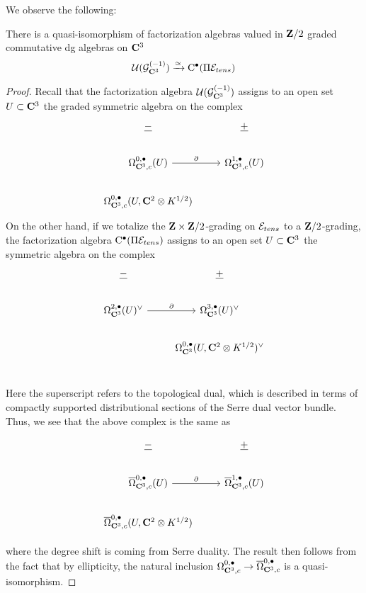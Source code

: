 \documentclass[../main.tex]{subfiles}
\begin{document}
We observe the following:
\begin{prop}
\label{prop:factabelian}
There is a quasi-isomorphism of factorization algebras valued in $\mathbf{Z}/2$ graded commutative dg algebras on $\mathbf{C}^3$
\[
\mathcal{U} (\mathcal{G}^{(-1)}_{\mathbf{C}^3} )\xrightarrow{\simeq} {\mathrm{C}}^\bullet(\Pi \mathcal{E}_{tens})
\]
\end{prop}

\begin{proof}
Recall that the factorization algebra $\mathcal{U}(\mathcal{G}_{\mathbf{C}^3}^{(-1)})$ assigns to an open set $U\subset \mathbf{C}^3$ the graded symmetric algebra on the complex
\begin{equation}\label{eqn:weight-1}
\begin{tikzcd}
\ul{-} & \ul{+}\\
\Omega_{\C^3, c}^{0,\bullet}(U) \ar[r,"\del"] & \Omega_{\C^3, c}^{1,\bullet}(U) \\
\Omega_{\C^3, c}^{0,\bullet}(U, \C^2\otimes K^{1/2}) & 
\end{tikzcd}
\end{equation}
On the other hand, if we totalize the $\mathbf{Z}\times\mathbf{Z}/2$-grading on $\mathcal{E}_{tens}$ to a $\mathbf{Z}/2$-grading, the factorization algebra ${\mathrm{C}}^\bullet (\Pi \mathcal{E}_{tens})$ assigns to an open set $U\subset \mathbf{C}^3$ the symmetric algebra on the complex 
\begin{equation}
\begin{tikzcd}
\ul{-} & \ul{+}\\
\Omega_{\C^3}^{2,\bullet}(U)^\vee \ar[r,"\del"] & \Omega_{\C^3}^{3,\bullet}(U)^\vee \\
& \Omega_{\C^3}^{0,\bullet}(U, \C^2\otimes K^{1/2})^\vee \\
\end{tikzcd}
\end{equation}

Here the superscript refers to the topological dual, which is described in terms of compactly supported distributional sections of the Serre dual vector bundle. Thus, we see that the above complex is the same as 

\begin{equation}
\begin{tikzcd}
\ul{-} & \ul{+}\\
\overline \Omega_{\C^3, c}^{0,\bullet}(U) \ar[r,"\del"] & \overline \Omega_{\C^3, c}^{1,\bullet}(U) \\
\overline \Omega_{\C^3, c}^{0,\bullet}(U, \C^2\otimes K^{1/2}) & 
\end{tikzcd}
\end{equation}

where the degree shift is coming from Serre duality. The result then follows from the fact that by ellipticity, the natural inclusion $\Omega^{0,\bullet}_{\mathbf{C}^3,c}\to\overline \Omega^{0,\bullet}_{\mathbf{C}^3,c}$ is a quasi-isomorphism.
\end{proof}
\end{document}

